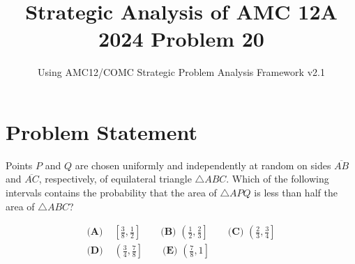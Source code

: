 \documentclass[11pt]{article}
\begin{document}
\title{\textbf{Strategic Analysis of AMC 12A 2024 Problem 20}}
\author{Using AMC12/COMC Strategic Problem Analysis Framework v2.1}
\date{}
\maketitle

\section*{Problem Statement}

Points $P$ and $Q$ are chosen uniformly and independently at random on sides $\overline{AB}$ and $\overline{AC}$, respectively, of equilateral triangle $\triangle ABC$. Which of the following intervals contains the probability that the area of $\triangle APQ$ is less than half the area of $\triangle ABC$?

\begin{align*}
\textbf{(A) } &\left[\frac{3}{8}, \frac{1}{2}\right] \qquad 
\textbf{(B) } \left(\frac{1}{2}, \frac{2}{3}\right] \qquad 
\textbf{(C) } \left(\frac{2}{3}, \frac{3}{4}\right] \\
\textbf{(D) } &\left(\frac{3}{4}, \frac{7}{8}\right] \qquad 
\textbf{(E) } \left(\frac{7}{8}, 1\right]
\end{align*}

\vspace{0.5cm}
\end{document}
